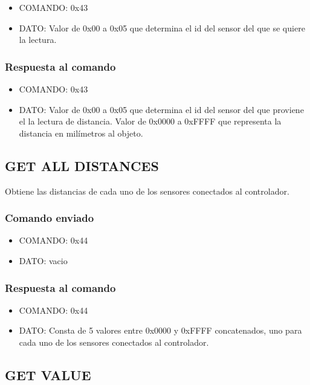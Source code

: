 \documentclass[a4paper,10pt]{article}
\begin{document}
\begin{itemize}
	\item{COMANDO:} 0x43
	\item{DATO:} Valor de 0x00 a 0x05 que determina el id del sensor del que se quiere la lectura.
\end{itemize}

\subsubsection*{Respuesta al comando}

\begin{itemize}
	\item{COMANDO:} 0x43
	\item{DATO:} Valor de 0x00 a 0x05 que determina el id del sensor del que proviene el la lectura de distancia.
	Valor de 0x0000 a 0xFFFF que representa la distancia en mil\'imetros al objeto.
\end{itemize}

\subsection{GET ALL DISTANCES}
\label{get_all_distances_us}

Obtiene las distancias de cada uno de los sensores conectados al controlador.

\subsubsection*{Comando enviado}

\begin{itemize}
	\item{COMANDO:} 0x44
	\item{DATO:} vacio
\end{itemize}

\subsubsection*{Respuesta al comando}

\begin{itemize}
	\item{COMANDO:} 0x44
	\item{DATO:} Consta de 5 valores entre 0x0000 y 0xFFFF concatenados, uno para cada uno de los sensores conectados al controlador.
\end{itemize}

\subsection{GET VALUE}
\label{get_value_us}
\end{document}
